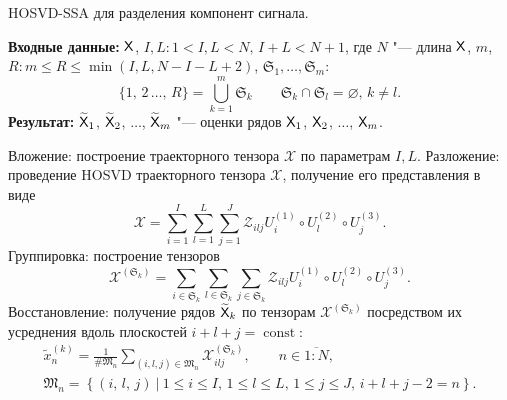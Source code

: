 \documentclass[specialist,
    substylefile=spbu.rtx,
    subf,href,colorlinks=true, 12pt]{disser}
\theoremstyle{plain}
\theoremstyle{definition}
\theoremstyle{remark}
\newcommand{\Input}{\textbf{Входные данные: }}
\newcommand{\Output}{\textbf{Результат: }}
\begin{document}
   \begin{algorithm}[!h]
        \caption{HOSVD-SSA для разделения компонент сигнала.}
        \label{alg:hosvd-ssa-components}
        \Input $\mathsf{X}$, $I,L: 1< I,L < N,\, I + L < N + 1$, где $N$ "--- длина $\mathsf{X}$,
         $m$,\linebreak $R: m \leqslant R\leqslant \min(I, L, N-I-L+2)$,
        $\mathfrak{S}_1, \ldots, \mathfrak{S}_m$:
        \[
            \{1,\, 2\,\ldots,\, R\}=\bigcup_{k=1}^{m}\mathfrak{S}_k \qquad \mathfrak{S}_k\cap \mathfrak{S}_l =\varnothing,\,
        k\ne l.
        \]
        \Output $\widetilde{\mathsf{X}}_1$, $\widetilde{\mathsf{X}}_2$, $\ldots$, $\widetilde{\mathsf{X}}_m$ "--- оценки рядов
        $\mathsf{X}_1$, $\mathsf{X}_2$, $\ldots$, $\mathsf{X}_m$.
        \begin{algorithmic}[1]
            \State \label{alg:first-step}
            Вложение: построение траекторного тензора $\mathcal{X}$ по параметрам $I, L$.
            \State \label{alg:second-step}
            Разложение: проведение HOSVD траекторного тензора $\mathcal{X}$, получение его представления в виде
            \begin{equation}
                \mathcal{X}=\sum_{i=1}^{I} \sum_{l=1}^{L} \sum_{j=1}^{J} \mathcal{Z}_{ilj} U^{(1)}_{i}
                \circ U^{(2)}_{l} \circ U^{(3)}_{j}.
                \label{eq:trajectory-hosvd}
            \end{equation}
            \State Группировка: построение тензоров
            \begin{equation*}
                \mathcal{X}^{(\mathfrak{S}_k)}=\sum_{i \in \mathfrak{S}_k} \sum_{l\in \mathfrak{S}_k} \sum_{j\in \mathfrak{S}_k}
                \mathcal{Z}_{ilj} U^{(1)}_{i}\circ U^{(2)}_{l} \circ U^{(3)}_{j}.
            \end{equation*}
            \State Восстановление: получение рядов $\widetilde{\mathsf{X}}_k$ по тензорам
            $\mathcal{X}^{(\mathfrak{S}_k)}$ посредством их усреднения вдоль
            плоскостей $i+l+j=\operatorname{const}$:
            \begin{gather*}
                \tilde{x}^{(k)}_n=\frac{1}{\#\mathfrak{M}_n}\sum_{(i,l,j)\in \mathfrak{M}_n} \mathcal{X}^{(\mathfrak{S}_k)}_{ilj},\qquad n\in \overline{1:N},         \\
                \mathfrak{M}_n=\left\{(i,\, l,\, j)~\Big|~1\leqslant i \leqslant I,\, 1\leqslant l \leqslant L,\, 1\leqslant j \leqslant J,\, i+l+j-2=n\right\}.
            \end{gather*}
        \end{algorithmic}
    \end{algorithm}
\end{document}
